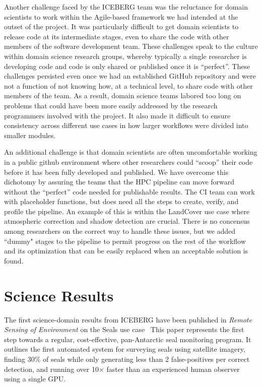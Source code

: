 \documentclass[manuscript,screen]{acmart}
\begin{document}
Another challenge faced by the ICEBERG team was the reluctance for domain scientists to work within the Agile-based framework we had intended at the outset of the project. It was particularly difficult to get domain scientists to release code at its intermediate stages, even to share the  code with other members of the software development team. These challenges speak to the culture within domain science research groups, whereby  typically a single researcher is developing code and code is only shared or published once it is ``perfect''. These challenges persisted even once we had an established GitHub repository and were not a function of not knowing  how, at a technical level, to share code with other members of the team. As a result, domain science teams labored too long on problems that could have  been more easily addressed by the research programmers involved with the  project. It also made it difficult to ensure consistency across different use cases in how larger workflows were divided into smaller modules.

An additional challenge is that domain scientists are often uncomfortable  working in a public github environment where other researchers could  ``scoop'' their code before it has been fully developed and published. We have overcome this dichotomy by assuring the teams that the HPC pipeline can move forward without the ``perfect'' code needed for publishable results.  The CI team can work with placeholder functions, but does need all the steps to create, verify, and profile the pipeline. An example of this is within the LandCover use case where atmospheric correction and shadow detection are crucial.  There is no concensus among researchers on the correct way to handle these issues, but we added ``dummy" stages to the pipeline to permit progress on the rest of the workflow and its optimization that can be easily replaced when an acceptable solution is found.

\section{Science Results}
The first science-domain results from ICEBERG have been published in {\textsl{Remote Sensing of Environment}} on the Seals use case~\cite{BCG:20}
This paper represents the first step towards a regular, cost-effective, pan-Antarctic seal monitoring program.  It outlines the first automated system for surveying seals using satellite imagery, 
finding 30\% of seals while only generating less than 2 false-positives per correct detection, and running
over 10× faster than an experienced human observer using a single GPU.
\end{document}

